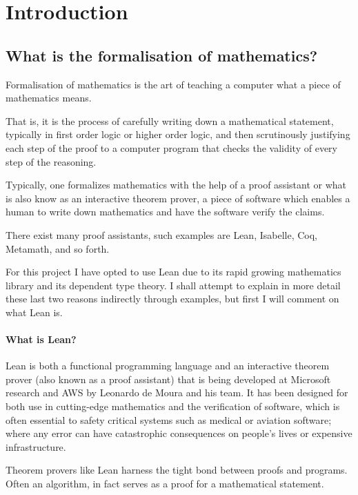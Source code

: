 \chapter{Introduction}\label{Ch2_Introduction}

\section{What is the formalisation of mathematics?}

Formalisation of mathematics is the art of teaching a computer what a piece of mathematics means.

That is, it is the process of carefully writing down a mathematical statement, typically in first order logic or higher order logic, 
and then scrutinously justifying each step of the proof to a computer program that checks the validity of every step of the reasoning. 

Typically, one formalizes mathematics with the help of a proof assistant or what is also know as an interactive theorem prover, 
a piece of software which enables a human to write down mathematics and have the software verify the claims.

There exist many proof assistants, such examples are Lean, Isabelle, Coq, Metamath, and so forth.

For this project I have opted to use Lean due to its rapid growing mathematics library and its dependent type theory. I shall attempt to explain in more detail these last two reasons indirectly through
examples, but first I will comment on what Lean is.

\subsubsection{What is Lean?}

Lean is both a functional programming language and an interactive theorem prover (also known as a proof assistant) that is being developed at Microsoft research and AWS by Leonardo de Moura and his team.
It has been designed for both use in cutting-edge mathematics and the verification of software, which is often essential to safety critical systems such as medical or aviation software; where any error can have
catastrophic consequences on people's lives or expensive infrastructure.

Theorem provers like Lean harness the tight bond between proofs and programs. Often an algorithm, in fact serves as a proof for a mathematical statement.

